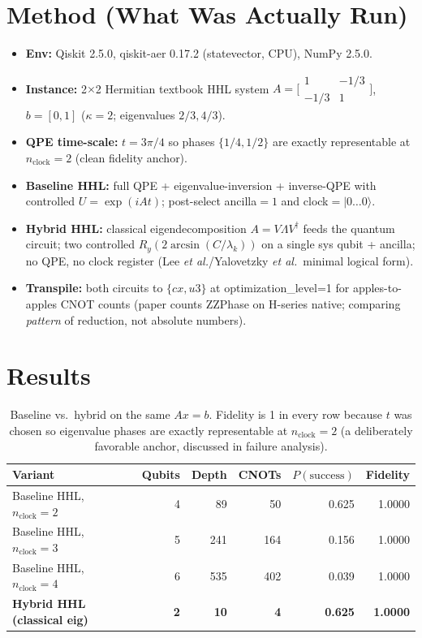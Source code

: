 \documentclass[11pt]{article}
\begin{document}
\section{Method (What Was Actually Run)}
\begin{itemize}
  \item \textbf{Env:} Qiskit 2.5.0, qiskit-aer 0.17.2 (statevector, CPU), NumPy 2.5.0.
  \item \textbf{Instance:} 2$\times$2 Hermitian textbook HHL system
    $A = \bigl[\begin{smallmatrix}1 & -1/3\\ -1/3 & 1\end{smallmatrix}\bigr]$,
    $b=[0,1]$ ($\kappa=2$; eigenvalues $2/3,4/3$).
  \item \textbf{QPE time-scale:} $t = 3\pi/4$ so phases $\{1/4, 1/2\}$
    are exactly representable at $n_\mathrm{clock}=2$ (clean fidelity
    anchor).
  \item \textbf{Baseline HHL:} full QPE + eigenvalue-inversion +
    inverse-QPE with controlled $U=\exp(iAt)$; post-select ancilla$=1$
    and clock$=|0\dots0\rangle$.
  \item \textbf{Hybrid HHL:} classical eigendecomposition $A=V\Lambda V^\dagger$
    feeds the quantum circuit; two controlled $R_y(2\arcsin(C/\lambda_k))$
    on a single sys qubit + ancilla; no QPE, no clock register (Lee
    \emph{et al.}/Yalovetzky \emph{et al.}\ minimal logical form).
  \item \textbf{Transpile:} both circuits to $\{cx, u3\}$ at
    optimization\_level=1 for apples-to-apples CNOT counts (paper counts
    ZZPhase on H-series native; comparing \emph{pattern} of reduction,
    not absolute numbers).
\end{itemize}

\section{Results}
\begin{table}[h]
\centering
\begin{tabular}{lrrrrr}
\toprule
Variant & Qubits & Depth & CNOTs & $P(\mathrm{success})$ & Fidelity \\
\midrule
Baseline HHL, $n_\mathrm{clock}=2$ & 4 & 89  & 50  & 0.625 & 1.0000 \\
Baseline HHL, $n_\mathrm{clock}=3$ & 5 & 241 & 164 & 0.156 & 1.0000 \\
Baseline HHL, $n_\mathrm{clock}=4$ & 6 & 535 & 402 & 0.039 & 1.0000 \\
\textbf{Hybrid HHL (classical eig)} & \textbf{2} & \textbf{10} & \textbf{4} & \textbf{0.625} & \textbf{1.0000} \\
\bottomrule
\end{tabular}
\caption{Baseline vs.\ hybrid on the same $Ax=b$. Fidelity is 1 in every
row because $t$ was chosen so eigenvalue phases are exactly representable
at $n_\mathrm{clock}=2$ (a deliberately favorable anchor, discussed in
failure analysis).}
\end{table}
\end{document}
